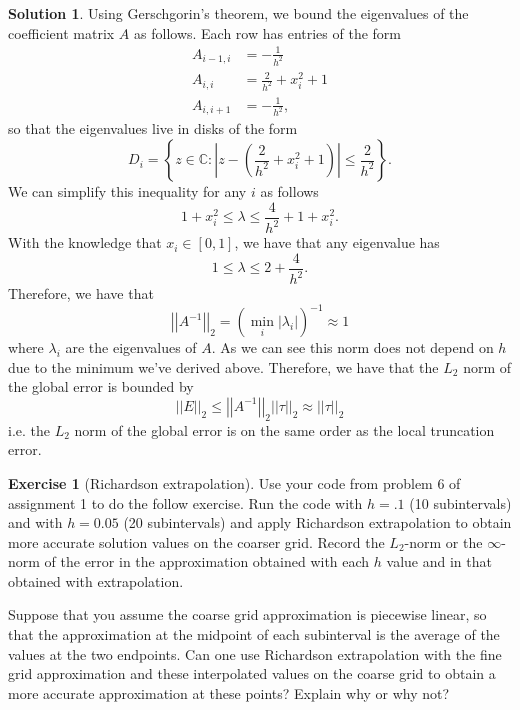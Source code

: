 \documentclass[12pt]{article}
\newcommand{\bbC}{\mathbb{C}}
\newcommand{\abs}[1]{ \left| #1 \right| }
\newcommand{\norm}[1]{ \left|\left| #1 \right|\right| }
\theoremstyle{definition}
\newtheorem{exer}{Exercise}
\newtheorem{sol}{Solution}
\theoremstyle{remark}
\begin{document}
\begin{sol}
    Using Gerschgorin's theorem, we bound the eigenvalues of the coefficient matrix $A$ as follows. Each row has entries of the form
    \begin{align*}
        A_{i-1,i} &= - \frac{1}{h^{2}}\\
        A_{i,i} &= \frac{2}{h^{2}} + x_{i}^{2} + 1\\
        A_{i,i+1} &= - \frac{1}{h^{2}},
    \end{align*}
    so that the eigenvalues live in disks of the form
    \begin{equation*}
      D_{i} = \left\{ z \in \bbC \colon \abs{z - \left(\frac{2}{h^{2}} + x_{i}^{2} + 1 \right)} \leq \frac{2}{h^{2}} \right\}.
    \end{equation*}
    We can simplify this inequality for any $i$ as follows
    \begin{equation*}
    1 + x_{i}^{2} \leq \lambda \leq \frac{4}{h^{2}} + 1 + x_{i}^{2}.
    \end{equation*}
    With the knowledge that $x_{i} \in [0,1]$, we have that any eigenvalue has
    \begin{equation*}
    1 \leq \lambda \leq 2 + \frac{4}{h^{2}}.
    \end{equation*}
    Therefore, we have that 
    \begin{equation*}
        \norm{A^{-1}}_{2} = \left(\min_{i} \abs{ \lambda_{i} } \right)^{-1} \approx 1
    \end{equation*}
    where $\lambda_{i}$ are the eigenvalues of $A$. As we can see this norm does not depend on $h$ due to the minimum we've derived above. Therefore, we have that the $L_{2}$ norm of the global error is bounded by
    \begin{equation*}
        \norm{ E }_{2} \leq \norm{A^{-1}}_{2} \norm{ \tau }_{2} \approx \norm{\tau }_{2}
    \end{equation*}
  i.e. the $L_{2}$ norm of the global error is on the same order as the local truncation error.
\end{sol}

\newpage

\begin{exer}[Richardson extrapolation]
    Use your code from problem 6 of assignment 1 to do the follow exercise. Run the code with $h = .1$ (10 subintervals) and with $h = 0.05$ (20 subintervals) and apply Richardson extrapolation to obtain more accurate solution values on the coarser grid. Record the $L_{2}$-norm or the $\infty$-norm of the error in the approximation obtained with each $h$ value and in that obtained with extrapolation.

    Suppose that you assume the coarse grid approximation is piecewise linear, so that the approximation at the midpoint of each subinterval is the average of the values at the two endpoints. Can one use Richardson extrapolation with the fine grid approximation and these interpolated values on the coarse grid to obtain a more accurate approximation at these points? Explain why or why not?
\end{exer}
\end{document}
